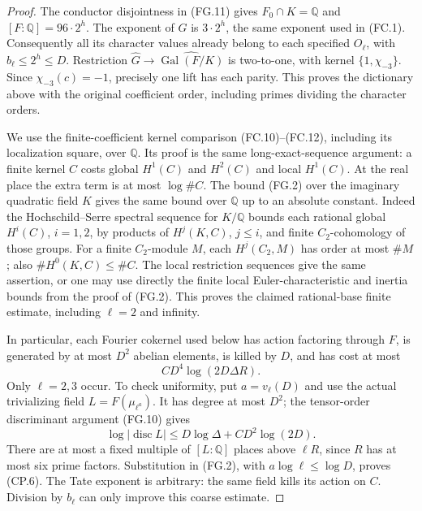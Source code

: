 \begin{proof}
The conductor disjointness in (FG.11) gives
$F_0\cap K=\mathbb Q$ and $[F:\mathbb Q]=96\cdot2^h$.
The exponent of $G$ is $3\cdot2^h$, the same exponent used in
(FC.1).  Consequently all its character values already belong
to each specified $O_\ell$, with $b_\ell\leq2^h\leq D$.
Restriction $\widehat G\to\widehat{\operatorname{Gal}(F/K)}$
is two-to-one, with kernel $\{1,\chi_{-3}\}$.
Since $\chi_{-3}(c)=-1$, precisely one lift has each parity.
This proves the dictionary above with the original coefficient
order, including primes dividing the character orders.

We use the finite-coefficient kernel comparison (FC.10)--(FC.12),
including its localization square, over $\mathbb Q$.
Its proof is the same long-exact-sequence argument: a finite
kernel $C$ costs global $H^1(C)$ and $H^2(C)$ and local $H^1(C)$.
At the real place the extra term is at most $\log\#C$.
The bound (FG.2) over the imaginary quadratic field $K$ gives
the same bound over $\mathbb Q$ up to an absolute constant.
Indeed the Hochschild--Serre spectral sequence for $K/\mathbb Q$
bounds each rational global $H^i(C)$, $i=1,2$, by products of
$H^j(K,C)$, $j\leq i$, and finite $C_2$-cohomology of those groups.
For a finite $C_2$-module $M$, each $H^j(C_2,M)$ has order at most
$\#M$; also $\#H^0(K,C)\leq\#C$.  The local restriction
sequences give the same assertion, or one may use directly
the finite local Euler-characteristic and inertia bounds from
the proof of (FG.2).  This proves the claimed rational-base
finite estimate, including $\ell=2$ and infinity.

In particular, each Fourier cokernel used below has action
factoring through $F$, is generated by at most $D^2$ abelian
elements, is killed by $D$, and has cost at most
\[
              C D^4\log(2D\Delta R).                              \tag{CP.6}
\]
Only $\ell=2,3$ occur.  To check uniformity, put
$a=v_\ell(D)$ and use the actual trivializing field
$L=F(\mu_{\ell^a})$.  It has degree at most $D^2$;
the tensor-order discriminant argument (FG.10) gives
\[
       \log|\operatorname{disc}L|
          \leq D\log\Delta+C D^2\log(2D).
\]
There are at most a fixed multiple of $[L:\mathbb Q]$ places
above $\ell R$, since $R$ has at most six prime factors.
Substitution in (FG.2), with $a\log\ell\leq\log D$, proves
(CP.6).  The Tate exponent is arbitrary: the same field kills
its action on $C$.  Division by $b_\ell$ can only improve this
coarse estimate.


\end{proof}
